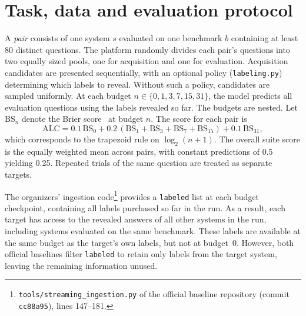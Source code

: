 \documentclass{article}
\newcommand{\code}[1]{\texttt{#1}}
\newcommand{\labeled}{\code{labeled}}
\newcommand{\ALC}{\mathrm{ALC}}
\begin{document}
\section{Task, data and evaluation protocol}
\label{sec:protocol}

A \emph{pair} consists of one system $s$ evaluated on one benchmark $b$ containing at least 80 distinct questions. The platform randomly divides each pair's questions into two equally sized pools, one for acquisition and one for evaluation. Acquisition candidates are presented sequentially, with an optional policy (\code{labeling.py}) determining which labels to reveal. Without such a policy, candidates are sampled uniformly. At each budget $n \in \{0,1,3,7,15,31\}$, the model predicts all evaluation questions using the labels revealed so far. The budgets are nested. Let $\mathrm{BS}_n$ denote the Brier score~\citep{Brier1950VERIFICATIONOF} at budget $n$. The score for each pair is
\begin{equation}
  \ALC = 0.1\,\mathrm{BS}_0 + 0.2\,(\mathrm{BS}_1 + \mathrm{BS}_3 + \mathrm{BS}_7 + \mathrm{BS}_{15}) + 0.1\,\mathrm{BS}_{31},
\end{equation}
which corresponds to the trapezoid rule on $\log_2(n+1)$. The overall suite score is the equally weighted mean across pairs, with constant predictions of 0.5 yielding 0.25. Repeated trials of the same question are treated as separate targets.

The organizers' ingestion code\footnote{\code{tools/streaming\_ingestion.py} of the official baseline repository (commit \code{cc88a95}), lines 147--181.} provides a \labeled{} list at each budget checkpoint, containing all labels purchased so far in the run. As a result, each target has access to the revealed answers of all other systems in the run, including systems evaluated on the same benchmark. These labels are available at the same budget as the target's own labels, but not at budget~0. However, both official baselines filter \labeled{} to retain only labels from the target system, leaving the remaining information unused.
\end{document}
